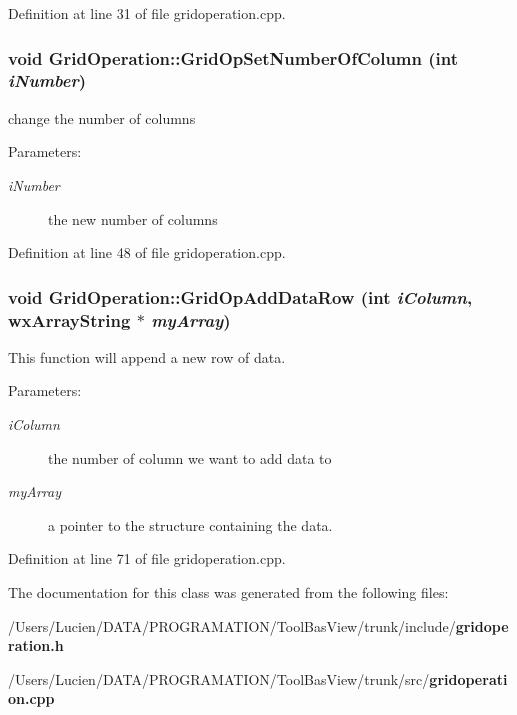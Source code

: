 Definition at line 31 of file gridoperation.cpp.
\subsubsection{\setlength{\rightskip}{0pt plus 5cm}void Grid\-Operation::Grid\-Op\-Set\-Number\-Of\-Column (int {\em i\-Number})}\label{class_grid_operation_5694a561dd9815ebcc2a27dbf3f3ee9d}


change the number of columns 

\begin{Desc}
\item[Parameters:]
\begin{description}
\item[{\em i\-Number}]the new number of columns \end{description}
\end{Desc}


Definition at line 48 of file gridoperation.cpp.
\subsubsection{\setlength{\rightskip}{0pt plus 5cm}void Grid\-Operation::Grid\-Op\-Add\-Data\-Row (int {\em i\-Column}, wx\-Array\-String $\ast$ {\em my\-Array})}\label{class_grid_operation_06152d56a01aed59eccb2a90cd51380b}


This function will append a new row of data. 

\begin{Desc}
\item[Parameters:]
\begin{description}
\item[{\em i\-Column}]the number of column we want to add data to \item[{\em my\-Array}]a pointer to the structure containing the data. \end{description}
\end{Desc}


Definition at line 71 of file gridoperation.cpp.

The documentation for this class was generated from the following files:\begin{CompactItemize}
\item 
/Users/Lucien/DATA/PROGRAMATION/Tool\-Bas\-View/trunk/include/{\bf gridoperation.h}\item 
/Users/Lucien/DATA/PROGRAMATION/Tool\-Bas\-View/trunk/src/{\bf gridoperation.cpp}\end{CompactItemize}
